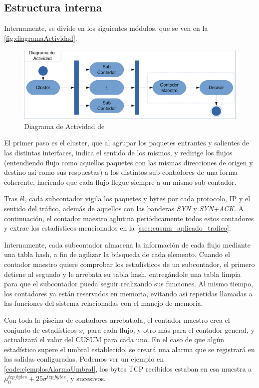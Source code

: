 \subsection{Estructura interna}
Internamente, \redborderddos{} se divide en los siguientes módulos, que se ven en la
\autoref{fig:diagramaActividad}.

\begin{figure}[htbp]
\includegraphics[width=\columnwidth]{CapituloEstructura/Figuras/DiagramaFlow-crop}
\caption{Diagrama de Actividad de \redborderddos}
\label{fig:diagramaActividad}
\end{figure}

El primer paso es el cluster, que al agrupar los paquetes entrantes y salientes de las distintas 
interfaces, indica el sentido de los mismos, y redirige los flujos (entendiendo flujo como aquellos
paquetes con las mismas direcciones de origen y destino así como sus respuestas) a los distintos 
sub-contadores de una forma coherente, haciendo que cada flujo llegue siempre a un mismo sub-contador.

Tras él, cada subcontador vigila los paquetes y bytes por cada protocolo, IP y el sentido
del tráfico, además de aquellos con las banderas \emph{SYN} y \emph{SYN+ACK}. A continuación,
el contador maestro aglutina periódicamente todos estos contadores y extrae los estadísticos
mencionados en la \autoref{ssec:cusum_aplicado_trafico}.

Internamente, cada subcontador almacena la información de cada flujo mediante una tabla hash,
a fin de agilizar la búsqueda de cada elemento. Cuando el contador maestro quiere comprobar
los estadísticos de un subcontador, el primero detiene al segundo y le arrebata su tabla hash,
entregándole una tabla limpia para que el subcontador pueda seguir realizando sus funciones. Al
mismo tiempo, los contadores ya están reservados en memoria, evitando así repetidas
llamadas a las funciones del sistema relacionadas con el manejo de memoria.

Con toda la piscina de contadores arrebatada, el contador maestro crea el conjunto de
estadísticos $x_i$ para cada flujo, y otro más para el contador general, y actualizará
el valor del CUSUM para cada uno. En el caso de que algún estadístico supere el umbral
establecido, se creará una alarma que se registrará en las salidas configuradas. Podemos
ver un ejemplo en \autoref{code:ejemplosAlarmaUmbral}, los bytes TCP recibidos estaban en
esa muestra a $\mu_0^{tcp\_bytes}+25\sigma^{tcp\_bytes}$, y sucesivos.

